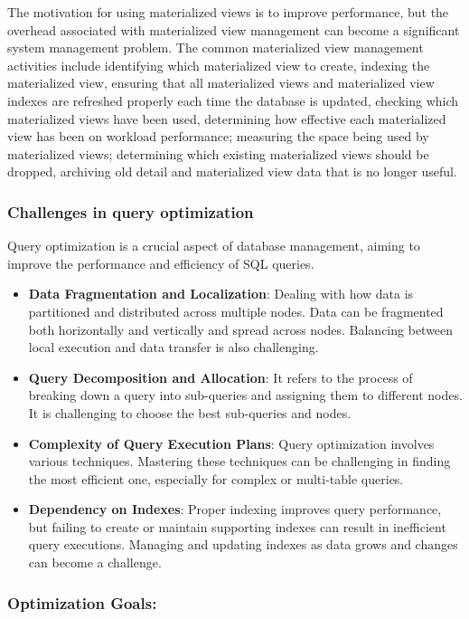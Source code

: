 The motivation for using materialized views is to improve performance, but the overhead associated with materialized view management can become a significant system management problem. The common materialized view management activities include identifying which materialized view to create, indexing the materialized view, ensuring that all materialized views and materialized view indexes are refreshed properly each time the database is updated, checking which materialized views have been used, determining how effective each materialized view has been on workload performance; measuring the space being used by materialized views; determining which existing materialized views should be dropped,  archiving old detail and materialized view data that is no longer useful.\cite{Ashadevi2008CostEA,1363763}

\subsubsection{Challenges in query optimization} Query optimization is a crucial aspect of database management, aiming to improve the performance and efficiency of SQL queries.
\begin{itemize}
    \item\textbf{Data Fragmentation and Localization}: Dealing with how data is partitioned and distributed across multiple nodes. Data can be fragmented both horizontally and vertically and spread across nodes. Balancing between local execution and data transfer is also challenging. 
    \item\textbf{Query Decomposition and Allocation}: It refers to the process of breaking down a query into sub-queries and assigning them to different nodes. It is challenging to choose the best sub-queries and nodes.
    \item\textbf{Complexity of Query Execution Plans}: Query optimization involves various techniques. Mastering these techniques can be challenging in finding the most efficient one, especially for complex or multi-table queries.
    \item\textbf{Dependency on Indexes}: Proper indexing improves query performance, but failing to create or maintain supporting indexes can result in inefficient query executions. Managing and updating indexes as data grows and changes can become a challenge.\\
    \cite{team-2020,etutorials-03-2024,editor-ijmter-2015}
\end{itemize}
\subsubsection*{Optimization Goals:}

